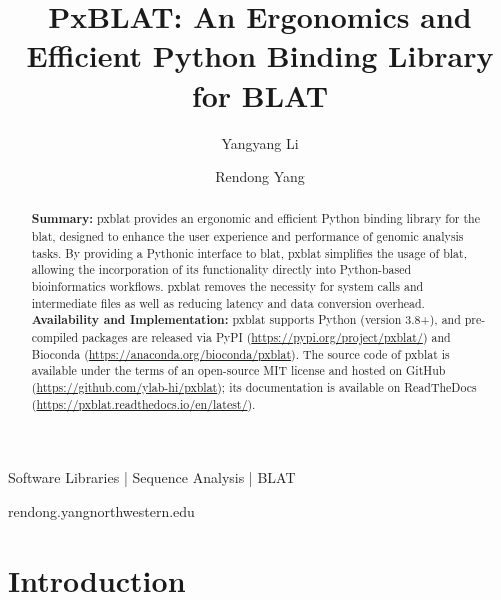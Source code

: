 
\title{PxBLAT: An Ergonomics and Efficient Python Binding Library for BLAT}

\author[1]{Yangyang Li}
\author[1,\Letter]{Rendong Yang }
\date{}

\maketitle

\begin{abstract}
	\textbf{Summary:}
	\gls{pxblat} provides an ergonomic and efficient Python binding library for the \gls{blat}, designed to enhance the user experience and performance of genomic analysis tasks.
	By providing a Pythonic interface to \gls{blat}, \gls{pxblat} simplifies the usage of \gls{blat}, allowing the incorporation of its functionality directly into Python-based bioinformatics workflows.
	\gls{pxblat} removes the necessity for system calls and intermediate files as well as reducing latency and data conversion overhead. \\
	\textbf{Availability and Implementation:}
	\gls{pxblat}  supports Python (version 3.8+), and pre-compiled packages are released via PyPI (\url{https://pypi.org/project/pxblat/}) and Bioconda (\url{https://anaconda.org/bioconda/pxblat}). The source code of \gls{pxblat}  is available under the terms of an open-source MIT license and hosted on GitHub (\url{https://github.com/ylab-hi/pxblat}); its documentation is available on ReadTheDocs (\url{https://pxblat.readthedocs.io/en/latest/}).
\end{abstract}

\begin{keywords}
	Software Libraries |  Sequence Analysis | BLAT
\end{keywords}

\begin{corrauthor}
	rendong.yang\at northwestern.edu
\end{corrauthor}

\section*{Introduction}\label{sec:introduction}

